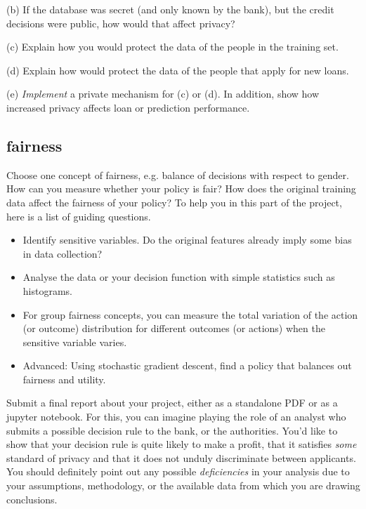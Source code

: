 (b) If the database was secret (and only known by the bank), but the credit
decisions were public, how would that affect privacy?

(c) Explain how you would protect the data of the people in the
training set. 

(d) Explain how would protect the data of the people that apply
for new loans.

(e) \emph{Implement} a private mechanism for (c) or (d). In addition,
show how increased privacy affects loan or prediction performance.

\subsection{fairness}

Choose one concept of fairness, e.g. balance of decisions with respect to gender. How can you measure whether your policy is fair? How does the original training data affect the fairness of your policy? To help you in this part of the project, here is a list of guiding questions.

\begin{itemize}
\item Identify sensitive variables. Do the original features already
  imply some bias in data collection?
\item Analyse the data or your decision function with simple
  statistics such as histograms.
\item For group fairness concepts, you can measure the total
  variation of the action (or outcome) distribution for different
  outcomes (or actions) when the sensitive variable varies.
\item Advanced: Using stochastic gradient descent, find a policy that
  balances out fairness and utility.
\end{itemize}

Submit a final report about your project, either as a standalone PDF
or as a jupyter notebook. For this, you can imagine playing the role
of an analyst who submits a possible decision rule to the bank, or
the authorities. You'd like to show that your decision rule is quite
likely to make a profit, that it satisfies \emph{some} standard of
privacy and that it does not unduly discriminate between
applicants. You should definitely point out any possible
\emph{deficiencies} in your analysis due to your assumptions,
methodology, or the available data from which you are drawing
conclusions.

